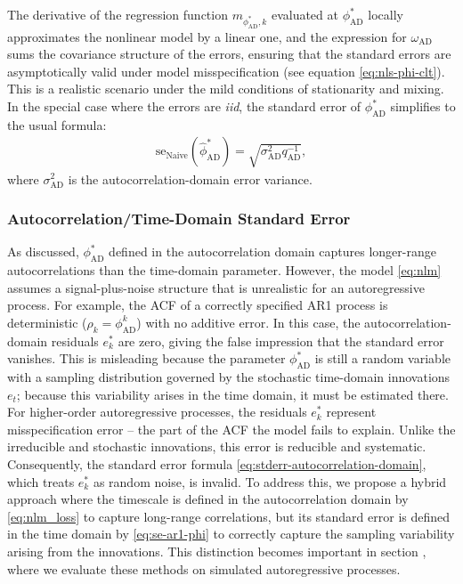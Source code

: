 \documentclass[9pt]{article}
\newcommand{\phiad}{\phi_{\scriptscriptstyle\text{AD}}}
\newcommand{\hatphiad}{\hat{\phi}^*_{\scriptscriptstyle\text{AD}}}
\newcommand{\qad}{q_{\scriptscriptstyle\text{AD}}}
\newcommand{\omegaad}{\omega_{\scriptscriptstyle\text{AD}}}
\newcommand{\sigmaad}{\sigma_{\scriptscriptstyle\text{AD}}}
\begin{document}
\noindent The derivative of the regression function $m_{\phiad^*, k}$ evaluated at $\phiad^*$ locally approximates the nonlinear model by a linear one, and the expression for $\omegaad$ sums the covariance structure of the errors, ensuring that the standard errors are asymptotically valid under model misspecification (see equation \eqref{eq:nls-phi-clt}). This is a realistic scenario under the mild conditions of stationarity and mixing. In the special case where the errors are \textit{iid}, the standard error of $\phiad^*$ simplifies to the usual formula:
\begin{align}
    \text{se}_{\text{Naive}}(\hatphiad) = \sqrt{\sigmaad^2 \qad^{-1}},
\end{align}
\noindent where $\sigmaad^2$ is the autocorrelation-domain error variance.

\subsubsection{Autocorrelation/Time-Domain Standard Error}\label{sec:stderr-time-autocorrelation-domain}

As discussed, $\phiad^*$ defined in the autocorrelation domain captures longer-range autocorrelations than the time-domain parameter. However, the model \eqref{eq:nlm} assumes a signal-plus-noise structure that is unrealistic for an autoregressive process. For example, the ACF of a correctly specified AR1 process is deterministic ($\rho_k=\phiad^k$) with no additive error. In this case, the autocorrelation-domain residuals $e_k^*$ are zero, giving the false impression that the standard error vanishes. This is misleading because the parameter $\phiad^*$ is still a random variable with a sampling distribution governed by the stochastic time-domain innovations $e_t$; because this variability arises in the time domain, it must be estimated there.\\

For higher-order autoregressive processes, the residuals $e_k^*$ represent misspecification error -- the part of the ACF the model fails to explain. Unlike the irreducible and stochastic innovations, this error is reducible and systematic. Consequently, the standard error formula \eqref{eq:stderr-autocorrelation-domain}, which treats $e_k^*$ as random noise, is invalid. To address this, we propose a hybrid approach where the timescale is defined in the autocorrelation domain by \eqref{eq:nlm_loss} to capture long-range correlations, but its standard error is defined in the time domain by \eqref{eq:se-ar1-phi} to correctly capture the sampling variability arising from the innovations. This distinction becomes important in section , where we evaluate these methods on simulated autoregressive processes.
\end{document}
